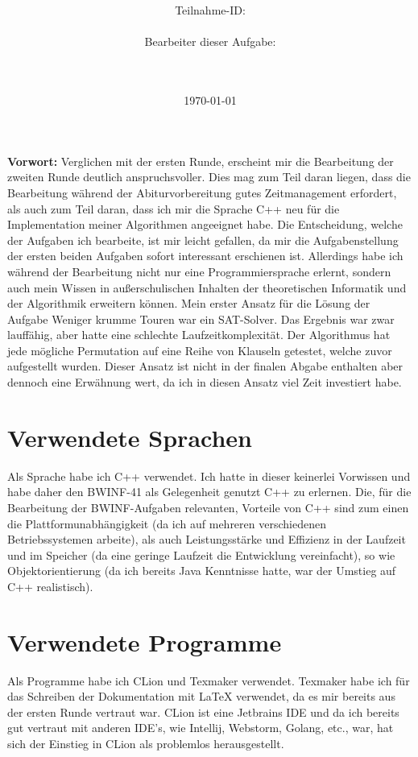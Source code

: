 \documentclass[a4paper,10pt,ngerman]{scrartcl}
\title{\textbf{\Huge\Aufgabe}}
\author{\LARGE Teilnahme-ID: \LARGE \TeilnahmeId \\\\
\LARGE Bearbeiter dieser Aufgabe: \\
\LARGE \Name\\\\}
\date{\LARGE\today}
\begin{document}
    \maketitle
    \tableofcontents
    \vspace{0.5cm}
    \textbf{Vorwort:}
    Verglichen mit der ersten Runde, erscheint mir die Bearbeitung der zweiten Runde deutlich anspruchsvoller.
    Dies mag zum Teil daran liegen, dass die Bearbeitung während der Abiturvorbereitung gutes Zeitmanagement erfordert,
    als auch zum Teil daran, dass ich mir die Sprache C++ neu für die Implementation meiner Algorithmen angeeignet habe.
    \newline
    Die Entscheidung, welche der Aufgaben ich bearbeite, ist mir leicht gefallen, da mir die Aufgabenstellung der ersten beiden
    Aufgaben sofort interessant erschienen ist.
    Allerdings habe ich während der Bearbeitung nicht nur eine Programmiersprache erlernt,
    sondern auch mein Wissen in außerschulischen Inhalten der theoretischen Informatik und der Algorithmik erweitern können.
    \newline
    Mein erster Ansatz für die Lösung der Aufgabe Weniger krumme Touren war ein SAT-Solver.
    Das Ergebnis war zwar lauffähig, aber hatte eine schlechte Laufzeitkomplexität.
    Der Algorithmus hat jede mögliche Permutation auf eine Reihe von Klauseln getestet, welche zuvor aufgestellt wurden.
    Dieser Ansatz ist nicht in der finalen Abgabe enthalten aber dennoch eine Erwähnung wert,
    da ich in diesen Ansatz viel Zeit investiert habe.
    \section{Verwendete Sprachen}\label{sec:verwendete-sprachen}
    Als Sprache habe ich C++ verwendet.
    Ich hatte in dieser keinerlei Vorwissen und habe daher den BWINF-41 als Gelegenheit genutzt C++ zu erlernen.
    Die, für die Bearbeitung der BWINF-Aufgaben relevanten, Vorteile von C++ sind zum einen die
    Plattformunabhängigkeit (da ich auf mehreren verschiedenen Betriebssystemen arbeite),
    als auch Leistungsstärke und Effizienz in der Laufzeit und im Speicher (da eine geringe Laufzeit die Entwicklung vereinfacht),
    so wie Objektorientierung (da ich bereits Java Kenntnisse hatte, war der Umstieg auf C++ realistisch).
    \section{Verwendete Programme}\label{sec:verwendete-programme}
    Als Programme habe ich CLion und Texmaker verwendet.
    Texmaker habe ich für das Schreiben der Dokumentation mit LaTeX verwendet,
    da es mir bereits aus der ersten Runde vertraut war.
    CLion ist eine Jetbrains IDE und da ich bereits gut vertraut mit anderen IDE's, wie Intellij, Webstorm, Golang, etc.,
    war, hat sich der Einstieg in CLion als problemlos herausgestellt.
\end{document}
